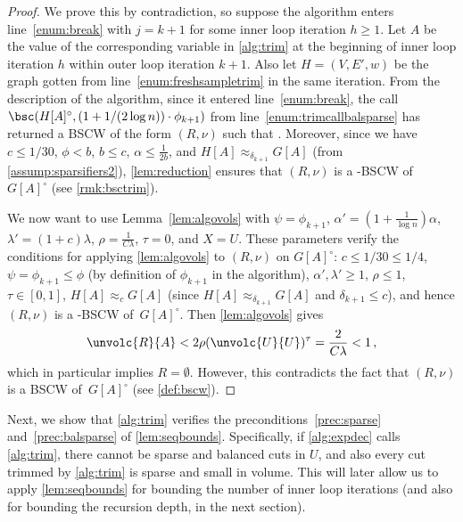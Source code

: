 \begin{proof}
	We prove this by contradiction, so suppose the algorithm enters line~\eqref{enum:break} with $j=k+1$ for some inner loop iteration $h \ge 1$. Let $A$ be the value of the corresponding variable in \cref{alg:trim} at the beginning of inner loop iteration $h$ within outer loop iteration $k+1$. Also let $H=(V,E',w)$ be the graph gotten from line~\eqref{enum:freshsampletrim} in the same iteration. From the description of the algorithm, since it entered line~\eqref{enum:break}, the call $\bsc(H[A]^\circ, (1+{1}/{(2\log n)}) \cdot \phi_{k+1})$ from line~\eqref{enum:trimcallbalsparse} has returned a BSCW of the form $(R,\nu)$ such that . Moreover, since we have $c \le 1/30$, $\phi < b$, $b \le c$, $\alpha \le \frac{1}{2b}$,  and $H[A] \approx_{\delta_{k+1}} G[A]$ (from \cref{assump:sparsifiers2}), \cref{lem:reduction} ensures that $(R,\nu)$ is a -BSCW of~$G[A]^\circ$ (see \cref{rmk:bsctrim}).
	
	We now want to use Lemma~\ref{lem:algovols} with $\psi = \phi_{k+1}$, $ \alpha'=(1+\frac{1}{\log n})\alpha$, $\lambda' =(1+c)\lambda$, $\rho= \frac{1}{C\lambda}$, $\tau=0$, and $X=U$. These parameters verify the conditions for applying \cref{lem:algovols} to $(R,\nu)$ on $G[A]^\circ$: $c \le 1/30 \le 1/4$, $\psi = \phi_{k+1} \le \phi$ (by definition of $\phi_{k+1}$ in the algorithm), $\alpha',\lambda' \ge 1$, $\rho \le 1$, $\tau \in [0,1]$, $H[A] \approx_{c} G[A]$ (since $H[A] \approx_{\delta_{k+1}} G[A]$ and $\delta_{k+1} \le c$), and  hence $(R,\nu)$ is a -BSCW of~$G[A]^\circ$. Then \cref{lem:algovols} gives
	\begin{equation*}
		\unvolc{R}{A} < 2 \rho (\unvolc{U}{U})^\tau = \frac{2}{C\lambda} < 1 \, ,
	\end{equation*}
	which in particular implies $R=\emptyset$. However, this contradicts the fact that $(R,\nu)$ is a BSCW of~$G[A]^\circ$ (see \cref{def:bscw}).
\end{proof}

\noindent
Next, we show that \cref{alg:trim} verifies the preconditions~\eqref{prec:sparse} and~\eqref{prec:balsparse} of \cref{lem:seqbounds}. Specifically, if \cref{alg:expdec} calls \cref{alg:trim}, there cannot be sparse and balanced cuts in $U$, and also every cut trimmed by \cref{alg:trim} is sparse and small in volume. This will later allow us to apply \cref{lem:seqbounds} for bounding the number of inner loop iterations (and also for bounding the recursion depth, in the next section).

